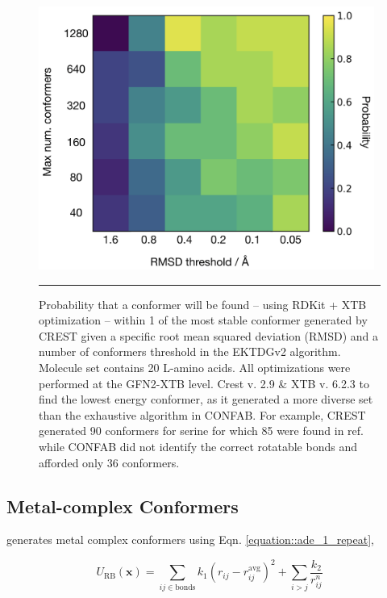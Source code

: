 \documentclass[../../main.tex]{subfiles}
\begin{document}
\begin{figure}[h!]
	\vspace{0.4cm}
	\centering
	\includegraphics[width=11cm]{5/autode/figs/figS2}
	\vspace{0.4cm}
	\hrule
	\caption{Probability that a conformer will be found -- using RDKit + XTB optimization -- within 1 \kcalx of the most stable conformer generated by CREST given a specific root mean squared deviation (RMSD) and a number of conformers threshold in the EKTDGv2 algorithm. Molecule set contains 20 L-amino acids. All optimizations were performed at the GFN2-XTB level. Crest v. 2.9 \& XTB v. 6.2.3 to find the lowest energy conformer, as it generated a more diverse set than the exhaustive algorithm in CONFAB. For example, CREST generated 90 conformers for serine for which 85 were found in ref. \cite{He2016} while CONFAB did not identify the correct rotatable bonds and afforded only 36 conformers.}
	\label{fig::ade_si_2}
\end{figure}

\clearpage
\subsection{Metal-complex Conformers}
\label{section::ade_si_metal_complex_confs}

\ade generates metal complex conformers using Eqn. \eqref{equation::ade_1_repeat},


\begin{equation}
	U_\text{RB}(\boldsymbol{x}) = \sum_{ij \in \text{bonds}} k_1 (r_{ij} - r_{ij}^\text{avg})^2 + \sum_{i > j} \frac{k_2}{r_{ij}^n}
	\label{equation::ade_1_repeat}
\end{equation}
\end{document}
